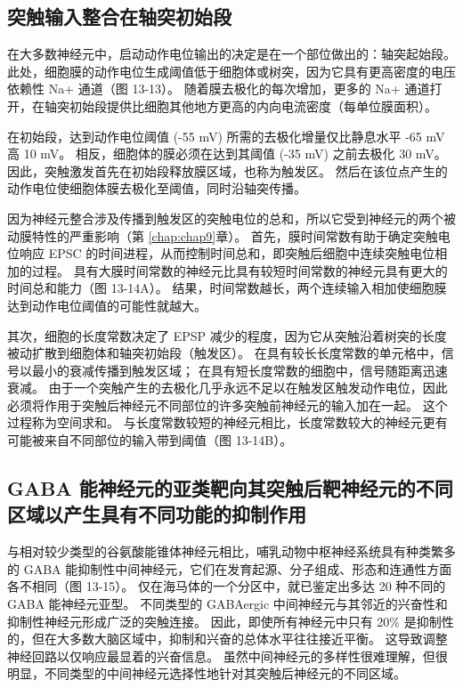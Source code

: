 \subsection{突触输入整合在轴突初始段}
在大多数神经元中，启动动作电位输出的决定是在一个部位做出的：轴突起始段。 
此处，细胞膜的动作电位生成阈值低于细胞体或树突，因为它具有更高密度的电压依赖性 Na+ 通道（图 13-13）。 
随着膜去极化的每次增加，更多的 Na+ 通道打开，在轴突初始段提供比细胞其他地方更高的内向电流密度（每单位膜面积）。


在初始段，达到动作电位阈值 (-55 mV) 所需的去极化增量仅比静息水平 -65 mV 高 10 mV。 
相反，细胞体的膜必须在达到其阈值 (-35 mV) 之前去极化 30 mV。 
因此，突触激发首先在初始段释放膜区域，也称为触发区。 
然后在该位点产生的动作电位使细胞体膜去极化至阈值，同时沿轴突传播。


因为神经元整合涉及传播到触发区的突触电位的总和，所以它受到神经元的两个被动膜特性的严重影响（第  \ref{chap:chap9}章）。 
首先，膜时间常数有助于确定突触电位响应 EPSC 的时间进程，从而控制时间总和，即突触后细胞中连续突触电位相加的过程。 
具有大膜时间常数的神经元比具有较短时间常数的神经元具有更大的时间总和能力（图 13-14A）。 
结果，时间常数越长，两个连续输入相加使细胞膜达到动作电位阈值的可能性就越大。


其次，细胞的长度常数决定了 EPSP 减少的程度，因为它从突触沿着树突的长度被动扩散到细胞体和轴突初始段（触发区）。 
在具有较长长度常数的单元格中，信号以最小的衰减传播到触发区域； 在具有短长度常数的细胞中，信号随距离迅速衰减。 
由于一个突触产生的去极化几乎永远不足以在触发区触发动作电位，因此必须将作用于突触后神经元不同部位的许多突触前神经元的输入加在一起。 
这个过程称为空间求和。 与长度常数较短的神经元相比，长度常数较大的神经元更有可能被来自不同部位的输入带到阈值（图 13-14B）。


\subsection{GABA 能神经元的亚类靶向其突触后靶神经元的不同区域以产生具有不同功能的抑制作用}

与相对较少类型的谷氨酸能锥体神经元相比，哺乳动物中枢神经系统具有种类繁多的 GABA 能抑制性中间神经元，它们在发育起源、分子组成、形态和连通性方面各不相同（图 13-15）。 
仅在海马体的一个分区中，就已鉴定出多达 20 种不同的 GABA 能神经元亚型。 
不同类型的 GABAergic 中间神经元与其邻近的兴奋性和抑制性神经元形成广泛的突触连接。 
因此，即使所有神经元中只有 20\% 是抑制性的，但在大多数大脑区域中，抑制和兴奋的总体水平往往接近平衡。 
这导致调整神经回路以仅响应最显着的兴奋信息。 
虽然中间神经元的多样性很难理解，但很明显，不同类型的中间神经元选择性地针对其突触后神经元的不同区域。


